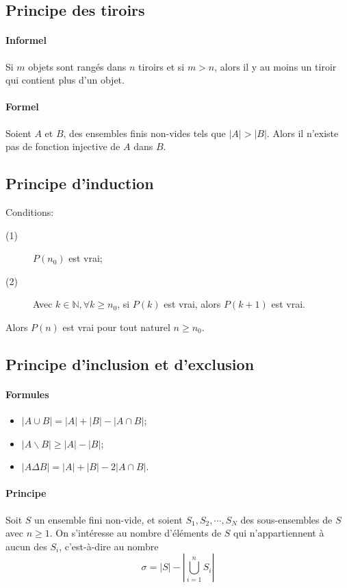 \subsection{Principe des tiroirs}
\paragraph{Informel}
Si $m$ objets sont rangés dans $n$ tiroirs et si $m > n$,
alors il y au moins un tiroir qui contient plus d'un objet.

\paragraph{Formel}
Soient $A$ et $B$, des ensembles finis non-vides tels que $|A| > |B|$.
Alors il n'existe pas de fonction injective de $A$ dans $B$.

\subsection{Principe d'induction}
Conditions:
\begin{description}
  \item[(1)] $P(n_0)$ est vrai;
  \item[(2)] Avec $k \in \mathbb{N}, \forall k \geq n_0$,
    si $P(k)$ est vrai, alors $P(k+1)$ est vrai.
\end{description}
Alors $P(n)$ est vrai pour tout naturel $n \geq n_0$.

\subsection{Principe d'inclusion et d'exclusion}
\paragraph{Formules}
\begin{itemize}
\item $|A \cup B| = |A| + |B| - |A \cap B|$;
\item $|A\backslash B| \geq |A| - |B|$;
\item $|A \Delta B| = |A| + |B| - 2|A \cap B|$.
\end{itemize}

\paragraph{Principe}
Soit $S$ un ensemble fini non-vide, et soient $S_1, S_2, \cdots, S_N$
des sous-ensembles de $S$ avec $n \geq 1$.
On s'intéresse au nombre d'éléments de $S$ qui n'appartiennent
à aucun des $S_i$, c'est-à-dire au nombre
\[ \sigma =|S| - \left | \bigcup_{i = 1}^n S_i \right | \]

